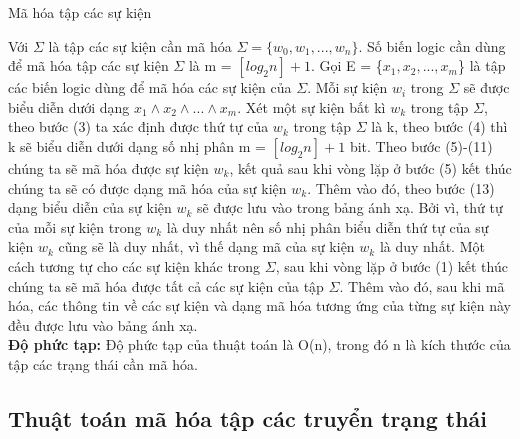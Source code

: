 \documentclass[a4paper,13pt,oneside,openany]{book}
\newenvironment{megaalgorithm}[1][htb]
{\renewcommand{\algorithmcfname}{Thuật toán}%
	\begin{algorithm}[#1]%
}{\end{algorithm}}
\begin{document}
\begin{flushleft}
\begin{megaalgorithm}[H]
			\caption{Mã hóa tập các sự kiện}
		\end{megaalgorithm}
		Với $\Sigma$ là tập các sự kiện cần mã hóa $\Sigma = \{w_0, w_1, ..., w_n\}$. Số biến logic cần dùng để mã hóa tập các sự kiện $\Sigma$ là m = $[log_{2}n] + 1$. Gọi E = \{$x_{1}, x_{2}, ..., x_{m}$\} là tập các biến logic dùng để mã hóa các sự kiện của $\Sigma$. Mỗi sự kiện $w_i$ trong $\Sigma$ sẽ được biểu diễn dưới dạng $x_{1}\land x_{2}\land...\land x_{m}$. Xét một sự kiện bất kì $w_k$ trong tập $\Sigma$, theo bước (3) ta xác định được thứ tự của $w_k$ trong tập $\Sigma$ là k, theo bước (4) thì k sẽ biểu diễn dưới dạng số nhị phân m = $[log_{2}n] + 1$ bit. Theo bước (5)-(11) chúng ta sẽ mã hóa được sự kiện $w_k$, kết quả sau khi vòng lặp ở bước (5) kết thúc chúng ta sẽ có được dạng mã hóa của sự kiện $w_k$. Thêm vào đó, theo bước (13) dạng biểu diễn của sự kiện $w_k$ sẽ được lưu vào trong bảng ánh xạ. Bởi vì, thứ tự của mỗi sự kiện trong $w_k$ là duy nhất nên số nhị phân biểu diễn thứ tự của sự kiện $w_k$ cũng sẽ là duy nhất, vì thế dạng mã của sự kiện $w_k$ là duy nhất. Một cách tương tự cho các sự kiện khác trong $\Sigma$, sau khi vòng lặp ở bước (1) kết thúc chúng ta sẽ mã hóa được tất cả các sự kiện của tập $\Sigma$. Thêm vào đó, sau khi mã hóa, các thông tin về các sự kiện và dạng mã hóa tương ứng của từng sự kiện này đều được lưu vào bảng ánh xạ.\\
		\textbf{Độ phức tạp:} Độ phức tạp của thuật toán là O(n), trong đó n là kích thước của tập các trạng thái cần mã hóa.\\	
				
		\subsection{Thuật toán mã hóa tập các truyển trạng thái}
		\begin{megaalgorithm}[H]
			\SetAlgoLined
			\DontPrintSemicolon
				

\end{megaalgorithm}
\end{flushleft}
\end{document}

